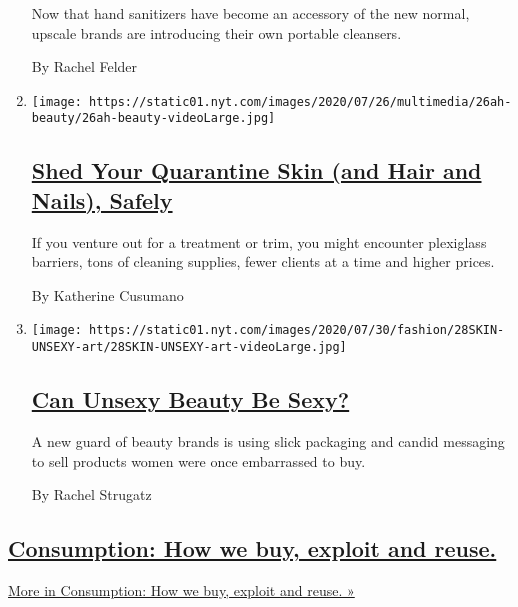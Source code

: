 \begin{enumerate}
  Now that hand sanitizers have become an accessory of the new normal,
  upscale brands are introducing their own portable cleansers.

  By Rachel Felder
\item
  \texttt{[image: https://static01.nyt.com/images/2020/07/26/multimedia/26ah-beauty/26ah-beauty-videoLarge.jpg]}

  \hypertarget{shed-your-quarantine-skin-and-hair-and-nails-safely}{%
  \subsection{\texorpdfstring{\href{/2020/07/25/at-home/coronavirus-salons.html}{Shed
  Your Quarantine Skin (and Hair and Nails),
  Safely}}{Shed Your Quarantine Skin (and Hair and Nails), Safely}}\label{shed-your-quarantine-skin-and-hair-and-nails-safely}}

  If you venture out for a treatment or trim, you might encounter
  plexiglass barriers, tons of cleaning supplies, fewer clients at a
  time and higher prices.

  By Katherine Cusumano
\item
  \texttt{[image: https://static01.nyt.com/images/2020/07/30/fashion/28SKIN-UNSEXY-art/28SKIN-UNSEXY-art-videoLarge.jpg]}

  \hypertarget{can-unsexy-beauty-be-sexy-1}{%
  \subsection{\texorpdfstring{\href{/2020/07/28/style/can-unsexy-beauty-be-sexy.html}{Can
  Unsexy Beauty Be
  Sexy?}}{Can Unsexy Beauty Be Sexy?}}\label{can-unsexy-beauty-be-sexy-1}}

  A new guard of beauty brands is using slick packaging and candid
  messaging to sell products women were once embarrassed to buy.

  By Rachel Strugatz
\end{enumerate}

\hypertarget{consumption-how-we-buy-exploit-and-reuse}{%
\subsection{\texorpdfstring{\href{/issue/fashion/2019/12/16/consumption}{Consumption:
How we buy, exploit and
reuse.}}{Consumption: How we buy, exploit and reuse.}}\label{consumption-how-we-buy-exploit-and-reuse}}

\href{/issue/fashion/2019/12/16/consumption}{More in Consumption: How we
buy, exploit and reuse. »}

